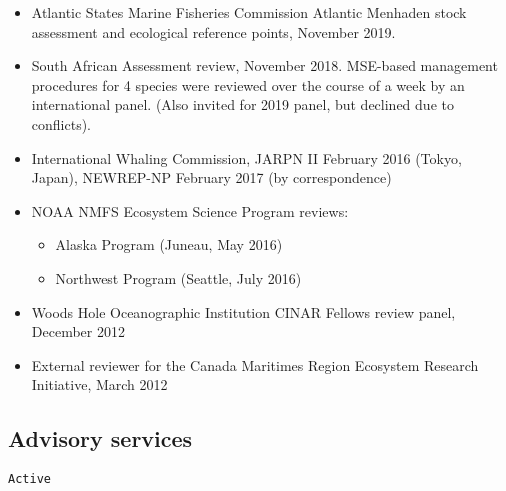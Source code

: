 \documentclass[11pt, a4paper]{awesome-cv}
\providecommand{\tightlist}{%
	\setlength{\itemsep}{0pt}\setlength{\parskip}{0pt}}
\begin{document}
\begin{itemize}
\item
  Atlantic States Marine Fisheries Commission Atlantic Menhaden stock
  assessment and ecological reference points, November 2019.
\item
  South African Assessment review, November 2018. MSE-based management
  procedures for 4 species were reviewed over the course of a week by an
  international panel. (Also invited for 2019 panel, but declined due to
  conflicts).
\item
  International Whaling Commission, JARPN II February 2016 (Tokyo,
  Japan), NEWREP-NP February 2017 (by correspondence)
\item
  NOAA NMFS Ecosystem Science Program reviews:

  \begin{itemize}
  \tightlist
  \item
    Alaska Program (Juneau, May 2016)
  \item
    Northwest Program (Seattle, July 2016)
  \end{itemize}
\item
  Woods Hole Oceanographic Institution CINAR Fellows review panel,
  December 2012
\item
  External reviewer for the Canada Maritimes Region Ecosystem Research
  Initiative, March 2012
\end{itemize}

\hypertarget{advisory-services}{%
\subsection{Advisory services}\label{advisory-services}}

\begin{verbatim}
Active
\end{verbatim}
\end{document}
